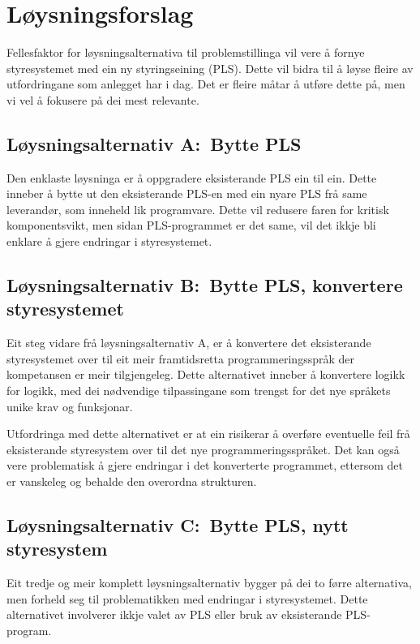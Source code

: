\newpage
\section{Løysningsforslag}

Fellesfaktor for løysningsalternativa til problemstillinga vil vere å fornye
styresystemet med ein ny styringseining (\gls{PLS}). 
Dette vil bidra til å løyse fleire av utfordringane som anlegget har i dag.\newline
Det er fleire måtar å utføre dette på, men vi vel å fokusere på dei mest relevante.

\subsection{Løysningsalternativ A:~Bytte \gls{PLS}}
Den enklaste løysninga er å oppgradere eksisterande \gls{PLS} ein til ein. 
Dette inneber å bytte ut den eksisterande \gls{PLS}-en med ein nyare \gls{PLS} frå same leverandør, som inneheld lik programvare.\newline
Dette vil redusere faren for kritisk komponentsvikt, men sidan \gls{PLS}-programmet er det same, 
vil det ikkje bli enklare å gjere endringar i styresystemet.

\subsection{Løysningsalternativ B:~Bytte \gls{PLS}, konvertere styresystemet}
Eit steg vidare frå løysningsalternativ A, er å konvertere det eksisterande styresystemet over til eit meir
framtidsretta programmeringsspråk der kompetansen er meir tilgjengeleg. Dette alternativet inneber å konvertere logikk for logikk,
med dei nødvendige tilpassingane som trengst for det nye språkets unike krav og funksjonar.

Utfordringa med dette alternativet er at ein risikerar å overføre eventuelle feil frå eksisterande
styresystem over til det nye programmeringsspråket. Det kan også vere problematisk å gjere endringar
i det konverterte programmet, ettersom det er vanskeleg og behalde den overordna strukturen.

\subsection{Løysningsalternativ C:~Bytte \gls{PLS}, nytt styresystem}
Eit tredje og meir komplett løysningsalternativ bygger på dei to førre alternativa, 
men forheld seg til problematikken med endringar i styresystemet.
Dette alternativet involverer ikkje valet av \gls{PLS} eller bruk av eksisterande \gls{PLS}-program.

